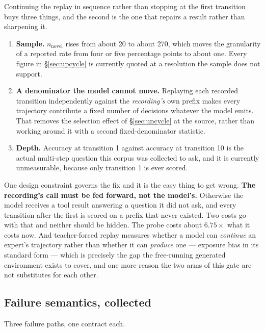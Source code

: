 \documentclass[11pt]{article}
\begin{document}
Continuing the replay in sequence rather than stopping at the first transition buys three things, and the second is the one that repairs a result rather than sharpening it.

\begin{enumerate}[label=(\roman*),itemsep=2pt]
\item \textbf{Sample.} $n_{\mathrm{novel}}$ rises from about 20 to about 270, which moves the granularity of a reported rate from four or five percentage points to about one. Every figure in \S\ref{sec:upcycle} is currently quoted at a resolution the sample does not support.
\item \textbf{A denominator the model cannot move.} Replaying each recorded transition independently against the \emph{recording's} own prefix makes every trajectory contribute a fixed number of decisions whatever the model emits. That removes the selection effect of \S\ref{sec:upcycle} at the source, rather than working around it with a second fixed-denominator statistic.
\item \textbf{Depth.} Accuracy at transition 1 against accuracy at transition 10 is the actual multi-step question this corpus was collected to ask, and it is currently unmeasurable, because only transition 1 is ever scored.
\end{enumerate}

One design constraint governs the fix and it is the easy thing to get wrong. \textbf{The recording's call must be fed forward, not the model's.} Otherwise the model receives a tool result answering a question it did not ask, and every transition after the first is scored on a prefix that never existed. Two costs go with that and neither should be hidden. The probe costs about $6.75\times$ what it costs now. And teacher-forced replay measures whether a model can \emph{continue} an expert's trajectory rather than whether it can \emph{produce} one --- exposure bias in its standard form --- which is precisely the gap the free-running generated environment exists to cover, and one more reason the two arms of this gate are not substitutes for each other.

\subsection{Failure semantics, collected}
\label{sec:failsem}

Three failure paths, one contract each.
\end{document}
